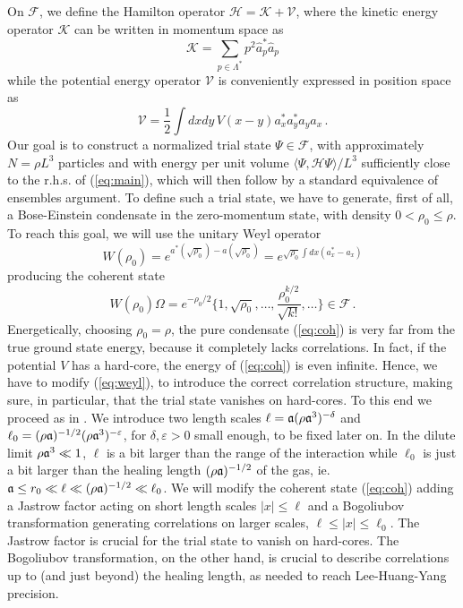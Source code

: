 \documentclass[a4paper,11pt]{article}
\def\cV{\mathcal{V}}
\def\cF{\mathcal{F}}
\def\cK{\mathcal{K}}
\def\cH{\mathcal{H}}
\def\eps{\varepsilon}
\numberwithin{equation}{section}
\begin{document}
On $\cF$, we define the Hamilton operator $\cH = \cK + \cV$, where the kinetic energy operator $\cK$ can be written in momentum space as 
\begin{equation}\label{eq:cK} \cK = \sum_{p \in \Lambda^*} p^2 \hat{a}_p^* \hat{a}_p \end{equation}
while the potential energy operator $\cV$ is conveniently expressed in position space as 
\begin{equation}\label{eq:cV} \cV = \frac{1}{2} \int dx dy \, V(x-y) a_x^* a_y^* a_y a_x  \,. \end{equation} 
Our goal is to construct a normalized trial state $\Psi \in \cF$, with approximately $N = \rho L^3$ particles and with energy per unit volume $\langle \Psi, \cH \Psi \rangle / L^3$ sufficiently close to the r.h.s. of (\ref{eq:main}), which will then follow by a standard equivalence of ensembles argument. To define such a trial state, we have to generate, first of all, a Bose-Einstein condensate in the zero-momentum state, with density $0 < \rho_0 \leq \rho$. To reach this goal, we will use the unitary Weyl operator 
\begin{equation}\label{eq:weyl} W(\rho_0) = e^{a^* (\sqrt{\rho_0}) - a (\sqrt{\rho_0})} = e^{\sqrt{\rho_0} \int dx (a_x^* - a_x)} \end{equation} 
producing the coherent state 
\begin{equation} \label{eq:coh} W(\rho_0) \Omega = e^{-\rho_0/2} \Big\{ 1, \sqrt{\rho_0}, \dots, \frac{\rho^{k/2}_0}{\sqrt{k!}}, \dots \Big\} \in \cF \,.\end{equation}
Energetically, choosing $\rho_0 = \rho$, the pure condensate (\ref{eq:coh}) is very far from the true ground state energy, because it completely lacks correlations. In fact, if the potential $V$ has a hard-core, the energy of (\ref{eq:coh}) is even infinite. Hence, we have to modify (\ref{eq:weyl}), to introduce the correct correlation structure, making sure, in particular, that the trial state vanishes on hard-cores. To this end we proceed as in \cite{BBCOS}. We introduce two length scales $\ell = \frak{a} (\rho \frak{a}^3)^{-\delta}$ and $\ell_0 = (\rho \frak{a})^{-1/2} (\rho \frak{a}^3)^{-\eps}$, for $\delta , \eps > 0$ small enough, to be fixed later on. In the dilute limit $\rho \frak{a}^3 \ll 1$, $\ell$ is a bit larger than the range of the interaction while $\ell_0$ is just a bit larger than the healing length $(\rho \frak{a})^{-1/2}$ of the gas, ie. $\frak{a} \leq r_0 \ll \ell \ll (\rho \frak{a})^{-1/2} \ll \ell_0$. We will modify the coherent state (\ref{eq:coh}) adding a Jastrow factor acting on short length scales $|x| \leq \ell$ and a Bogoliubov transformation generating correlations on larger scales, $\ell \leq |x| \leq \ell_0$. The Jastrow factor is crucial for the trial state to vanish on hard-cores. The Bogoliubov transformation, on the other hand, is crucial to describe correlations up to (and just beyond) the healing length, as needed to reach Lee-Huang-Yang precision. 
\end{document}
